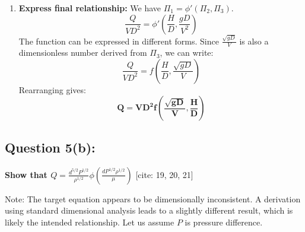\documentclass{article}
\begin{document}
\begin{enumerate}
    \item \textbf{Express final relationship:}
    We have $\Pi_1 = \phi'(\Pi_2, \Pi_3)$.
    $$ \frac{Q}{VD^2} = \phi'\left(\frac{H}{D}, \frac{gD}{V^2}\right) $$
    The function can be expressed in different forms. Since $\frac{\sqrt{gD}}{V}$ is also a dimensionless number derived from $\Pi_3$, we can write:
    $$ \frac{Q}{VD^2} = f\left(\frac{H}{D}, \frac{\sqrt{gD}}{V}\right) $$
    Rearranging gives:
    $$ \mathbf{Q=VD^{2}f\left(\frac{\sqrt{gD}}{V},\frac{H}{D}\right)} $$
\end{enumerate}
\hrulefill

\subsection*{\textbf{Question 5(b):}}
\textbf{Show that $Q=\frac{d^{5/2}P^{1/2}}{\rho^{1/2}}\phi\left(\frac{dP^{1/2}\rho^{1/2}}{\mu}\right)$} [cite: 19, 20, 21]

Note: The target equation appears to be dimensionally inconsistent. A derivation using standard dimensional analysis leads to a slightly different result, which is likely the intended relationship. Let us assume $P$ is pressure difference.
\end{document}

